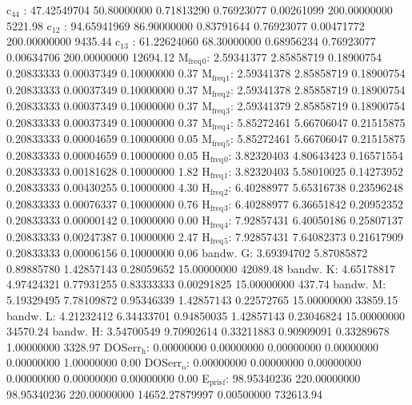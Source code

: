 \documentclass[11pt]{article}
\begin{document}
c\(_{\text{44}}\)    :  47.42549704  50.80000000   0.71813290   0.76923077   0.00261099 200.00000000      5221.98
c\(_{\text{12}}\)    :  94.65941969  86.90000000   0.83791644   0.76923077   0.00471772 200.00000000      9435.44
c\(_{\text{13}}\)    :  61.22624060  68.30000000   0.68956234   0.76923077   0.00634706 200.00000000     12694.12
M\(_{\text{freq}}\)\(_{\text{0}}\):   2.59341377   2.85858719   0.18900754   0.20833333   0.00037349   0.10000000         0.37
M\(_{\text{freq}}\)\(_{\text{1}}\):   2.59341378   2.85858719   0.18900754   0.20833333   0.00037349   0.10000000         0.37
M\(_{\text{freq}}\)\(_{\text{2}}\):   2.59341378   2.85858719   0.18900754   0.20833333   0.00037349   0.10000000         0.37
M\(_{\text{freq}}\)\(_{\text{3}}\):   2.59341379   2.85858719   0.18900754   0.20833333   0.00037349   0.10000000         0.37
M\(_{\text{freq}}\)\(_{\text{4}}\):   5.85272461   5.66706047   0.21515875   0.20833333   0.00004659   0.10000000         0.05
M\(_{\text{freq}}\)\(_{\text{5}}\):   5.85272461   5.66706047   0.21515875   0.20833333   0.00004659   0.10000000         0.05
H\(_{\text{freq}}\)\(_{\text{0}}\):   3.82320403   4.80643423   0.16571554   0.20833333   0.00181628   0.10000000         1.82
H\(_{\text{freq}}\)\(_{\text{1}}\):   3.82320403   5.58010025   0.14273952   0.20833333   0.00430255   0.10000000         4.30
H\(_{\text{freq}}\)\(_{\text{2}}\):   6.40288977   5.65316738   0.23596248   0.20833333   0.00076337   0.10000000         0.76
H\(_{\text{freq}}\)\(_{\text{3}}\):   6.40288977   6.36651842   0.20952352   0.20833333   0.00000142   0.10000000         0.00
H\(_{\text{freq}}\)\(_{\text{4}}\):   7.92857431   6.40050186   0.25807137   0.20833333   0.00247387   0.10000000         2.47
H\(_{\text{freq}}\)\(_{\text{5}}\):   7.92857431   7.64082373   0.21617909   0.20833333   0.00006156   0.10000000         0.06
bandw. G:   3.69394702   5.87085872   0.89885780   1.42857143   0.28059652  15.00000000     42089.48
bandw. K:   4.65178817   4.97424321   0.77931255   0.83333333   0.00291825  15.00000000       437.74
bandw. M:   5.19329495   7.78109872   0.95346339   1.42857143   0.22572765  15.00000000     33859.15
bandw. L:   4.21232412   6.34433701   0.94850035   1.42857143   0.23046824  15.00000000     34570.24
bandw. H:   3.54700549   9.70902614   0.33211883   0.90909091   0.33289678   1.00000000      3328.97
DOSerr\(_{\text{h}}\):   0.00000000   0.00000000   0.00000000   0.00000000   0.00000000   1.00000000         0.00
DOSerr\(_{\text{o}}\):   0.00000000   0.00000000   0.00000000   0.00000000   0.00000000   0.00000000         0.00
E\(_{\text{pris}}\)\(_{\text{f}}\):  98.95340236 220.00000000  98.95340236 220.00000000 14652.27879997   0.00500000    732613.94
\end{document}
